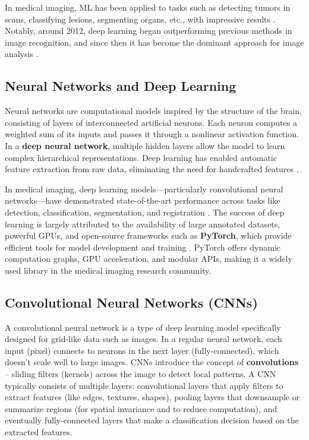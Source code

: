 \documentclass[12pt, BSc]{muthesis}
\begin{document}
In medical imaging, ML has been applied to tasks such as detecting tumors in scans, classifying lesions, segmenting organs, etc., with impressive results \cite{litjens2017survey}. Notably, around 2012, deep learning began outperforming previous methods in image recognition, and since then it has become the dominant approach for image analysis \cite{krizhevsky2012imagenet}.

\subsection{Neural Networks and Deep Learning}

Neural networks are computational models inspired by the structure of the brain, consisting of layers of interconnected artificial neurons. Each neuron computes a weighted sum of its inputs and passes it through a nonlinear activation function. In a \textbf{deep neural network}, multiple hidden layers allow the model to learn complex hierarchical representations. Deep learning has enabled automatic feature extraction from raw data, eliminating the need for handcrafted features \cite{goodfellow2016deep}.

In medical imaging, deep learning models—particularly convolutional neural networks—have demonstrated state-of-the-art performance across tasks like detection, classification, segmentation, and registration \cite{shen2017deep}. The success of deep learning is largely attributed to the availability of large annotated datasets, powerful GPUs, and open-source frameworks such as \textbf{PyTorch}, which provide efficient tools for model development and training \cite{paszke2019pytorch}. PyTorch offers dynamic computation graphs, GPU acceleration, and modular APIs, making it a widely used library in the medical imaging research community.

\subsection{Convolutional Neural Networks (CNNs)}

A convolutional neural network is a type of deep learning model specifically designed for grid-like data such as images. In a regular neural network, each input (pixel) connects to neurons in the next layer (fully-connected), which doesn’t scale well to large images. CNNs introduce the concept of \textbf{convolutions} – sliding filters (kernels) across the image to detect local patterns. A CNN typically consists of multiple layers: convolutional layers that apply filters to extract features (like edges, textures, shapes), pooling layers that downsample or summarize regions (for spatial invariance and to reduce computation), and eventually fully-connected layers that make a classification decision based on the extracted features.
\end{document}
